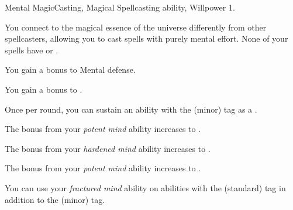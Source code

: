     \begin{feat}{Mental Magic}{Casting, Magical}
        \featpre Spellcasting ability, Willpower 1.

         You connect to the magical essence of the universe differently from other spellcasters, allowing you to cast spells with purely mental effort.
        None of your spells have  or .

         You gain a  bonus to Mental defense.

         You gain a  bonus to .

         Once per round, you can sustain an ability with the  (minor) tag as a .

         The bonus from your \textit{potent mind} ability increases to .

         The bonus from your \textit{hardened mind} ability increases to .

         The bonus from your \textit{potent mind} ability increases to .

         You can use your \textit{fractured mind} ability on abilities with the  (standard) tag in addition to the  (minor) tag.
    \end{feat}

